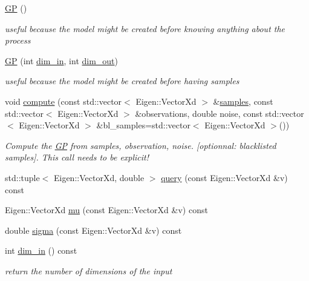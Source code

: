 \begin{DoxyCompactItemize}
\item 
\hyperlink{classlimbo_1_1model_1_1_g_p_aa18de82f231f3aed6ce8cce4c778aedb}{G\+P} ()
\begin{DoxyCompactList}\small\item\em useful because the model might be created before knowing anything about the process \end{DoxyCompactList}\item 
\hyperlink{classlimbo_1_1model_1_1_g_p_ab36947c89e4f5ad92599656a21829755}{G\+P} (int \hyperlink{classlimbo_1_1model_1_1_g_p_a41d99e6a69d53fc7d9260d295f787bc3}{dim\+\_\+in}, int \hyperlink{classlimbo_1_1model_1_1_g_p_a077144695f9f0b33b64d4feb8fb4e447}{dim\+\_\+out})
\begin{DoxyCompactList}\small\item\em useful because the model might be created before having samples \end{DoxyCompactList}\item 
void \hyperlink{classlimbo_1_1model_1_1_g_p_abb8c8521002a7157f48423e9b6739ee0}{compute} (const std\+::vector$<$ Eigen\+::\+Vector\+Xd $>$ \&\hyperlink{classlimbo_1_1model_1_1_g_p_abaa15a2e503bac670dd1a35fb377aa23}{samples}, const std\+::vector$<$ Eigen\+::\+Vector\+Xd $>$ \&observations, double noise, const std\+::vector$<$ Eigen\+::\+Vector\+Xd $>$ \&bl\+\_\+samples=std\+::vector$<$ Eigen\+::\+Vector\+Xd $>$())
\begin{DoxyCompactList}\small\item\em Compute the \hyperlink{classlimbo_1_1model_1_1_g_p}{G\+P} from samples, observation, noise. \mbox{[}optionnal\+: blacklisted samples\mbox{]}. This call needs to be explicit! \end{DoxyCompactList}\item 
std\+::tuple$<$ Eigen\+::\+Vector\+Xd, double $>$ \hyperlink{classlimbo_1_1model_1_1_g_p_a33937ff7df97c01fdd9bf8911e0a6159}{query} (const Eigen\+::\+Vector\+Xd \&v) const 
\item 
Eigen\+::\+Vector\+Xd \hyperlink{classlimbo_1_1model_1_1_g_p_a5d26e30b8c53400cdf12058d83dc41f0}{mu} (const Eigen\+::\+Vector\+Xd \&v) const 
\item 
double \hyperlink{classlimbo_1_1model_1_1_g_p_a2ea153c1de2021740235cfa10822395d}{sigma} (const Eigen\+::\+Vector\+Xd \&v) const 
\item 
int \hyperlink{classlimbo_1_1model_1_1_g_p_a41d99e6a69d53fc7d9260d295f787bc3}{dim\+\_\+in} () const 
\begin{DoxyCompactList}\small\item\em return the number of dimensions of the input \end{DoxyCompactList}\item 

\end{DoxyCompactItemize}
